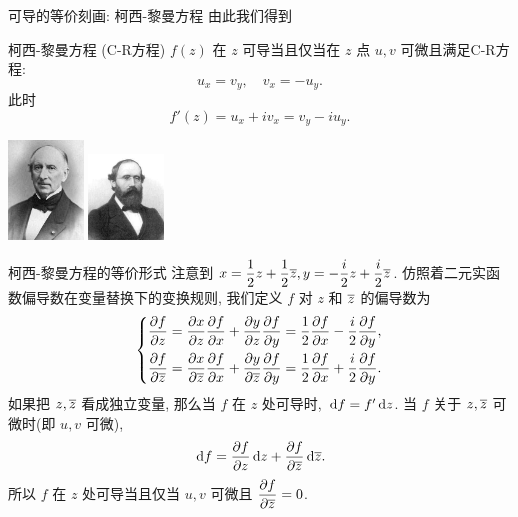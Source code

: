 \begin{frame}{可导的等价刻画: 柯西-黎曼方程}
	\onslide<+->
	由此我们得到
	\onslide<+->
	\begin{alertblock}{柯西-黎曼方程 (C-R方程)}
		$f(z)$ 在 $z$ 可导当且仅当在 $z$ 点 $u,v$ 可微且满足C-R方程:
		\[u_x=v_y,\quad v_x=-u_y.\]
		此时
		\[f'(z)=u_x+iv_x=v_y-iu_y.\]
	\end{alertblock}

	\onslide<+->
	\begin{center}
		\includegraphics[width=2cm]{../image/Cauchy.jpeg}
		\hspace{2cm}
		\includegraphics[width=2cm]{../image/Riemann.jpeg}
	\end{center}
\end{frame}


\begin{frame}{柯西-黎曼方程的等价形式\noexer}
	\onslide<+->
	注意到 $x=\dfrac12z+\dfrac12\overline z,y=-\dfrac i2z+\dfrac i2\overline z$.
	\onslide<+->
	仿照着二元实函数偏导数在变量替换下的变换规则, 我们定义 $f$ 对 $z$ 和 $\overline z$ 的偏导数为
	\[\left\{
	\begin{aligned}
		\frac{\partial f}{\partial z}&
	=\frac{\partial x}{\partial z}\frac{\partial f}{\partial x}
		+\frac{\partial y}{\partial z}\frac{\partial f}{\partial y}
	=\frac12\frac{\partial f}{\partial x}-\frac i2\frac{\partial f}{\partial y},\\
		\frac{\partial f}{\partial \overline z}&
	=\frac{\partial x}{\partial \overline z}\frac{\partial f}{\partial x}
		+\frac{\partial y}{\partial \overline z}\frac{\partial f}{\partial y}
	=\frac12\frac{\partial f}{\partial x}+\frac i2\frac{\partial f}{\partial y}.
	\end{aligned}\right.\]
	\onslide<+->
	如果把 $z,\overline z$ 看成独立变量, 那么当 $f$ 在 $z$ 处可导时,
	$\,\mathrm{d} f=f'\,\mathrm{d} z$.
	当 $f$ 关于 $z,\overline z$ 可微时(即 $u,v$ 可微),
	\[\,\mathrm{d} f=\frac{\partial f}{\partial z}\,\mathrm{d} z+\frac{\partial f}{\partial \overline z}\,\mathrm{d}\overline z.\]
	\onslide<+->
	所以 \alert{$f$ 在 $z$ 处可导当且仅当 $u,v$ 可微且 $\dfrac{\partial f}{\partial \overline z}=0$.}
\end{frame}


